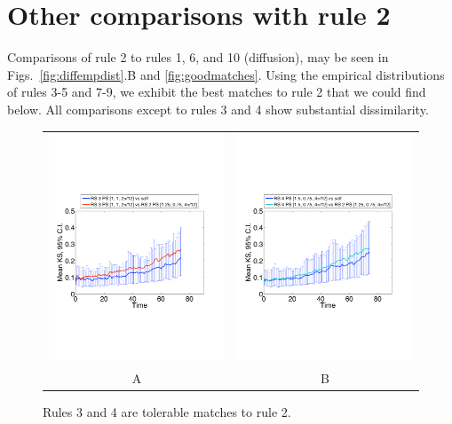 \documentclass[12pt]{article}
\begin{document}
\section{Other comparisons with rule 2}\label{app:rule2matches}

Comparisons of rule 2 to rules 1, 6, and 10 (diffusion), may be seen in Figs.~\ref{fig:diffempdist}.B and \ref{fig:goodmatches}. Using the empirical distributions of rules 3-5 and 7-9, we exhibit the best matches to rule 2 that we could find below. All comparisons except to rules 3 and 4 show substantial dissimilarity. 

\begin{figure}[htp]
\begin{tabular}{cc}
	\includegraphics[width=3.25in]{figures/KSstat_RS03PS091_vs_RS02PS027.pdf} & \includegraphics[width=3.25in]{figures/KSstat_RS04PS060_vs_RS02PS027.pdf} \\
	A & B \\
\end{tabular}
\caption{Rules 3 and 4 are tolerable matches to rule 2.}
\label{ksstatsopp3}
\end{figure}
\end{document}
